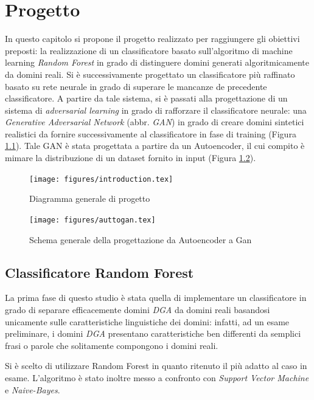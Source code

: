 \chapter{Progetto}
\label{progetto}

In questo capitolo si propone il progetto realizzato per raggiungere gli obiettivi preposti: la realizzazione di un classificatore basato sull'algoritmo di machine learning \textit{Random Forest} in grado di distinguere domini generati algoritmicamente da domini reali. Si è successivamente progettato un classificatore più raffinato basato su rete neurale in grado di superare le mancanze de precedente classificatore. A partire da tale sistema, si è passati alla progettazione di un sistema di \textit{adversarial learning} in grado di rafforzare il classificatore neurale: una \textit{Generative Adversarial Network} (abbr. \textit{GAN}) in grado di creare domini sintetici realistici da fornire successivamente al classificatore in fase di training (Figura \ref{fig:intro}). Tale GAN è stata progettata a partire da un Autoencoder, il cui compito è mimare la distribuzione di un dataset fornito in input (Figura \ref{fig:auttogan}).

\begin{figure}[htb]
    \centering
	\texttt{[image: figures/introduction.tex]}
\label{fig:intro}
\caption{Diagramma generale di progetto}
\end{figure}

\begin{figure}[htb]
    \centering
	\texttt{[image: figures/auttogan.tex]}
\label{fig:auttogan}
\caption{Schema generale della progettazione da Autoencoder a Gan}
\end{figure}

\section{Classificatore Random Forest}
\label{randomforest}
La prima fase di questo studio è stata quella di implementare un classificatore in grado di separare efficacemente domini \textit{DGA} da domini reali basandosi unicamente sulle caratteristiche linguistiche dei domini: infatti, ad un esame preliminare, i domini \textit{DGA} presentano caratteristiche ben differenti da semplici frasi o parole che solitamente compongono i domini reali.

Si è scelto di utilizzare Random Forest in quanto ritenuto il più adatto al caso in esame. L'algoritmo è stato inoltre messo a confronto con \textit{Support Vector Machine} e \textit{Naive-Bayes}.

